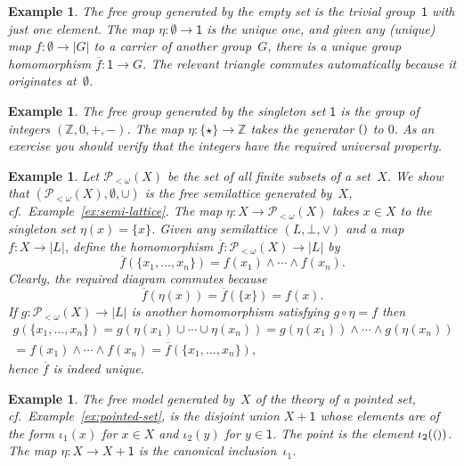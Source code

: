 \documentclass{amsart}
\newcommand{\ZZ}{\mathbb{Z}} %
\newcommand{\carrier}[1]{|#1|} %
\newcommand{\set}[1]{\{#1\}} %
\newcommand{\finpow}[1]{\mathcal{P}_{{<}\omega}(#1)} %
\newcommand{\one}{\mathsf{1}} %
\newcommand{\unit}{{\text{\small$()$}}} %
\newtheorem{example}[definition]{Example}
\begin{document}
\begin{example}
  The free group generated by the empty set is the trivial group~$\one$ with
  just one element. The map $\eta : \emptyset \to \one$ is the unique one, and
  given any (unique) map $f : \emptyset \to \carrier{G}$ to a carrier of another
  group~$G$, there is a unique group homomorphism $\overline{f} : \one \to G$.
  The relevant triangle commutes automatically because it originates
  at~$\emptyset$.
\end{example}

\begin{example}
  The free group generated by the singleton set $\one$ is the group of integers
  $(\ZZ, 0, {+}, {-})$. The map $\eta : \set{\star} \to \ZZ$ takes the generator
  $\unit$ to $0$. As an exercise you should verify that the integers have the
  required universal property.
\end{example}

\begin{example}
  Let $\finpow{X}$ be the set of all finite subsets of a set~$X$. We show that
  $(\finpow{X}, \emptyset, {\cup})$ is the free semilattice generated by~$X$, cf.\
  Example~\ref{ex:semi-lattice}. The map $\eta : X \to \finpow{X}$ takes $x \in X$ to the
  singleton set $\eta(x) = \set{x}$. Given any semilattice $(L, \bot, {\vee})$ and a map
  $f : X \to \carrier{L}$, define the homomorphism $\overline{f} : \finpow{X} \to \carrier{L}$ by
  \begin{equation*}
    \overline{f}(\set{x_1, \ldots, x_n}) = f(x_1) \wedge \cdots \wedge f(x_n).
  \end{equation*}
  Clearly, the required diagram commutes because
  \begin{equation*}
    \overline{f}(\eta(x)) = \overline{f}(\set{x}) = f(x).
  \end{equation*}
  If $g : \finpow{X} \to \carrier{L}$ is another homomorphism satisfying $g \circ \eta = f$ then
  \begin{multline*}
    g(\set{x_1, \ldots, x_n})
    = g(\eta(x_1) \cup \cdots \cup \eta(x_n))
    = g(\eta(x_1)) \wedge \cdots \wedge g(\eta(x_n)) \\
    = f(x_1) \wedge \cdots \wedge f(x_n)
    = \overline{f}(\set{x_1, \ldots, x_n}),
  \end{multline*}
  hence $\overline{f}$ is indeed unique.
\end{example}

\begin{example}
  The free model generated by~$X$ of the theory of a pointed set, cf.\
  Example~\ref{ex:pointed-set}, is the disjoint union $X + \one$ whose elements are of the
  form $\iota_1(x)$ for $x \in X$ and $\iota_2(y)$ for $y \in \one$. The point is the
  element $\iota_2(\unit)$. The map $\eta : X \to X + \one$ is the canonical
  inclusion~$\iota_1$.
\end{example}
\end{document}
